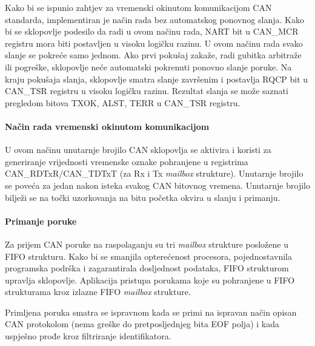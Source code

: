Kako bi se ispunio zahtjev za vremenski okinutom komunikacijom CAN standarda, implementiran je način rada bez automatskog ponovnog slanja. Kako bi se sklopovlje podesilo da radi u ovom načinu rada, NART bit u CAN\_MCR registru mora biti postavljen u visoku logičku razinu. U ovom načinu rada svako slanje se pokreće samo jednom. Ako prvi pokušaj zakaže, radi gubitka arbitraže ili pogreške, sklopovlje neće automatski pokrenuti ponovno slanje poruke. Na kraju pokušaja slanja, sklopovlje smatra slanje završenim i postavlja RQCP bit u CAN\_TSR registru u visoku logičku razinu. Rezultat slanja se može saznati pregledom bitova TXOK, ALST, TERR u CAN\_TSR registru.

\paragraph{Način rada vremenski okinutom komunikacijom}

U ovom načinu unutarnje brojilo CAN sklopovlja se aktivira i koristi za generiranje vrijednosti vremenske oznake pohranjene u registrima CAN\_RDTxR/CAN\_TDTxT (za Rx i Tx \textit{mailbox} strukture). Unutarnje brojilo se poveća za jedan nakon isteka svakog CAN bitovnog vremena. Unutarnje brojilo bilježi se na točki uzorkovanja na bitu početka okvira u slanju i primanju.

\paragraph{Primanje poruke}

Za prijem CAN poruke na raspolaganju su tri \textit{mailbox} strukture posložene u FIFO strukturu. Kako bi se smanjila opterećenost procesora, pojednostavnila programska podrška i zagarantirala dosljednost podataka, FIFO strukturom upravlja sklopovlje. Aplikacija pristupa porukama koje su pohranjene u FIFO strukturama kroz izlazne FIFO \textit{mailbox} strukture.

Primljena poruka smatra se ispravnom kada se primi na ispravan način opisan CAN protokolom (nema greške do pretposljednjeg bita EOF polja) i kada uspješno prođe kroz filtriranje identifikatora.

